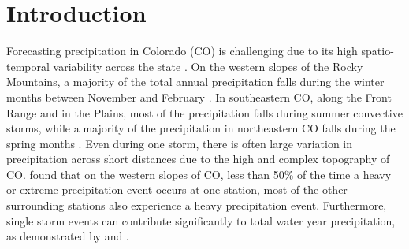 \documentclass[draft]{agujournal2019}
\begin{document}
\section{Introduction}
\label{intro}

Forecasting precipitation in Colorado (CO) is challenging due to its high spatio-temporal variability across the state \cite{Serreze2001CharacteristicsData, Cowie1986ColoradoAnalysis, Kirk2018LargeBasin, Lute2014RoleStates}. On the western slopes of the Rocky Mountains, a majority of the total annual precipitation falls during the winter months between November and February \cite{Doesken1984Period., Harvey2019CitizensFrom}. In southeastern CO, along the Front Range and in the Plains, most of the precipitation falls during summer convective storms, while a majority of the precipitation in northeastern CO falls during the spring months \cite{Doesken1984Period., Harvey2019CitizensFrom}. Even during one storm, there is often large variation in precipitation across short distances due to the high and complex topography of CO.  found that on the western slopes of CO, less than 50\% of the time a heavy or extreme precipitation event occurs at one station, most of the other surrounding stations also experience a heavy precipitation event. Furthermore, single storm events can contribute significantly to total water year precipitation, as demonstrated by  and .

\end{document}

